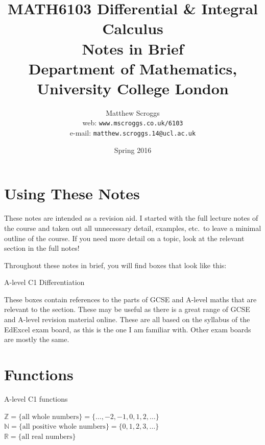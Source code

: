 \documentclass[11pt,a4paper,oneside]{book}
\begin{document}
\title{MATH6103 Differential \& Integral Calculus \\
Notes in Brief \\[1in]
Department of Mathematics, \\
University College London \\[1.5in]}
\author{\Large Matthew Scroggs \\
web: \texttt{www.mscroggs.co.uk/6103} \\
e-mail: \texttt{matthew.scroggs.14@ucl.ac.uk}}
\date{\Large Spring 2016}

\frontmatter
\maketitle
\tableofcontents

\mainmatter

\chapter*{Using These Notes}
These notes are intended as a revision aid. I started with the full lecture notes of the course and taken out all
unnecessary detail, examples, etc.\ to leave a minimal outline of the course. If you need more detail on a topic,
look at the relevant section in the full notes!

Throughout these notes in brief, you will find boxes that look like this:

\begin{gce}
A-level C1 Differentiation
\end{gce}

These boxes contain references to the parts of GCSE and A-level maths that are relevant to the section. These may
be useful as there is a great range of GCSE and A-level revision material online. These are all based on the syllabus 
of the EdExcel exam board, as this is the one I am familiar with. Other exam boards are mostly the same.

\chapter{Functions}
\begin{gce}
A-level C1 functions
\end{gce}
$\mathbb{Z}=\{\text{all whole numbers}\}=\{\dots,-2,-1,0,1,2,\dots\}$\\
$\mathbb{N}=\{\text{all positive whole numbers}\}=\{0,1,2,3,\dots\}$\\
$\mathbb{R}=\{\text{all real numbers}\}$
\end{document}
